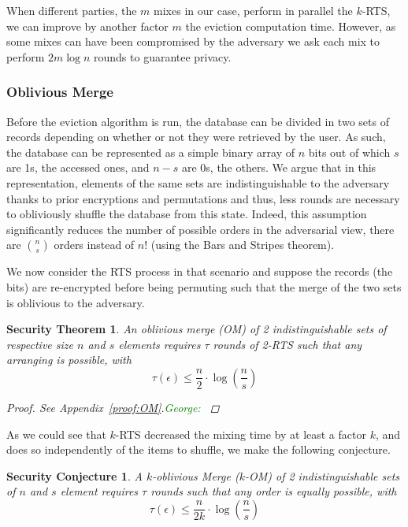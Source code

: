 \documentclass[USenglish,oneside,twocolumn]{article}
\newtheorem{secthm}{Security Theorem}
\newtheorem{seccjt}{Security Conjecture}
\newcommand{\george}[1]{\textcolor{green}{George: #1}}
\begin{document}
When different parties, the $m$ mixes in our case, perform in parallel the $k$-RTS, we can improve by another factor $m$ the eviction computation time. However, as some mixes can have been compromised by the adversary we ask each mix to perform $2 m\log n$ rounds to guarantee privacy.
%
\subsubsection{Oblivious Merge}\label{OM}
Before the eviction algorithm is run, the database can be divided in two sets of records depending on whether or not they were retrieved by the user. As such, the database can be represented as a simple binary array of $n$ bits out of which $s$ are 1s, the accessed ones, and $n-s$ are 0s, the others.
We argue that in this representation, elements of the same sets are indistinguishable to the adversary thanks to prior encryptions and permutations and thus, less rounds are necessary to obliviously shuffle the database from this state. Indeed, this assumption significantly reduces the number of possible orders in the adversarial view, there are  ${n \choose s}$ orders instead of $n!$ (using the Bars and Stripes theorem).

We now consider the RTS process in that scenario and suppose the records (the bits) are re-encrypted before being permuting such that the merge of the two sets is oblivious to the adversary.

\begin{secthm}
An oblivious merge (OM) of 2 indistinguishable sets of respective size $n$ and $s$ elements requires $\tau$ rounds of 2-RTS such that any arranging is possible, with
$$\tau(\epsilon) \leq \frac{n}{2}  \cdot \log \left (\frac{n}{s}\right)$$%
\begin{proof}
See Appendix~\ref{proof:OM}.\george{}
\end{proof}
\end{secthm}

As we could see that $k$-RTS decreased the mixing time by at least a factor $k$, and does so independently of the items to shuffle, we make the following conjecture.

\begin{seccjt}\label{sec:kOM}
A $k$-oblivious Merge ($k$-OM) of 2 indistinguishable sets of $n$ and $s$ element requires $\tau$ rounds such that any order is equally possible, with
$$ \tau(\epsilon) \leq \frac{n}{2k}  \cdot \log \left (\frac{n}{s}\right) $$
\end{seccjt}
%
\end{document}
